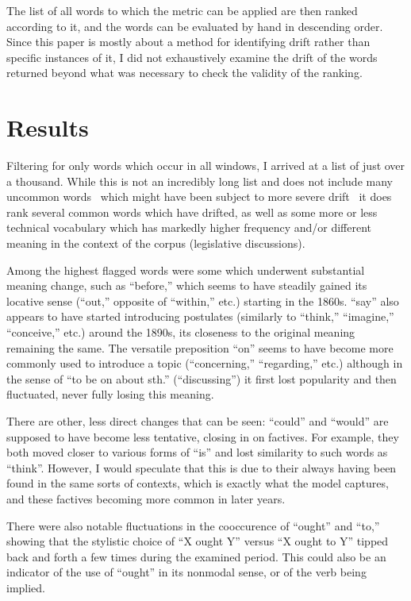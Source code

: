 \documentclass{article}
\begin{document}
The list of all words to which the metric can be applied are then ranked according to it, and the words can be evaluated by hand in descending order. Since this paper is mostly about a method for identifying drift rather than specific instances of it, I did not exhaustively examine the drift of the words returned beyond what was necessary to check the validity of the ranking.

\section{Results}

Filtering for only words which occur in all windows, I arrived at a list of just over a thousand. While this is not an incredibly long list and does not include many uncommon words \textemdash\ which might have been subject to more severe drift \textemdash\ it does rank several common words which have drifted, as well as some more or less technical vocabulary which has markedly higher frequency and/or different meaning in the context of the corpus (legislative discussions).

Among the highest flagged words were some which underwent substantial meaning change, such as ``before,'' which seems to have steadily gained its locative sense (``out,'' opposite of ``within,'' etc.) starting in the 1860s. ``say'' also appears to have started introducing postulates (similarly to ``think,'' ``imagine,'' ``conceive,'' etc.) around the 1890s, its closeness to the original meaning remaining the same. The versatile preposition ``on'' seems to have become more commonly used to introduce a topic (``concerning,'' ``regarding,'' etc.) although in the sense of ``to be on about sth.'' (``discussing'') it first lost popularity and then fluctuated, never fully losing this meaning.

There are other, less direct changes that can be seen: ``could'' and ``would'' are supposed to have become less tentative, closing in on factives. For example, they both moved closer to various forms of ``is'' and lost similarity to such words as ``think''. However, I would speculate that this is due to their always having been found in the same sorts of contexts, which is exactly what the model captures, and these factives becoming more common in later years.

There were also notable fluctuations in the cooccurence of ``ought'' and ``to,'' showing that the stylistic choice of ``X ought Y'' versus ``X ought to Y'' tipped back and forth a few times during the examined period. This could also be an indicator of the use of ``ought'' in its nonmodal sense, or of the verb being implied.
\end{document}

